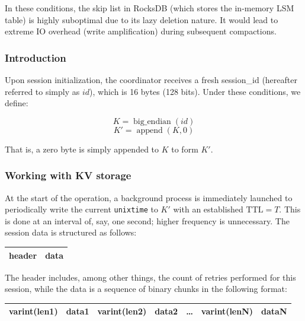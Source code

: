 \documentclass[a4paper,12pt]{article}
\begin{document}
    In these conditions, the skip list in RocksDB (which stores the in-memory LSM table) is highly suboptimal due to its lazy deletion nature. It would lead to extreme IO overhead (write amplification) during subsequent compactions.

    \subsubsection{Introduction}

    Upon session initialization, the coordinator receives a fresh session\_id (hereafter referred to simply as $id$), which is 16 bytes (128 bits). Under these conditions, we define:

    \[K = \operatorname{big\_endian}(id)\]
    \[K' = \operatorname{append}(K, 0)\]

    That is, a zero byte is simply appended to $K$ to form $K'$.

    \subsubsection{Working with KV storage}

    At the start of the operation, a background process is immediately launched to periodically write the current \texttt{unixtime} to $K'$ with an established $\text{TTL} = T$. This is done at an interval of, say, one second; higher frequency is unnecessary. The session data is structured as follows:

    \begin{center}
        \begin{tabular}{|l|r|}
            \hline
            header & data \\
            \hline
        \end{tabular}
    \end{center}

    The header includes, among other things, the count of retries performed for this session, while the data is a sequence of binary chunks in the following format:

    \begin{center}
        \begin{tabular}{|l|c|c|c|c|c|r|}
            \hline
            varint(len1) & data1 & varint(len2) & data2 & \dots & varint(lenN) & dataN \\
            \hline
        \end{tabular}
    \end{center}
\end{document}
